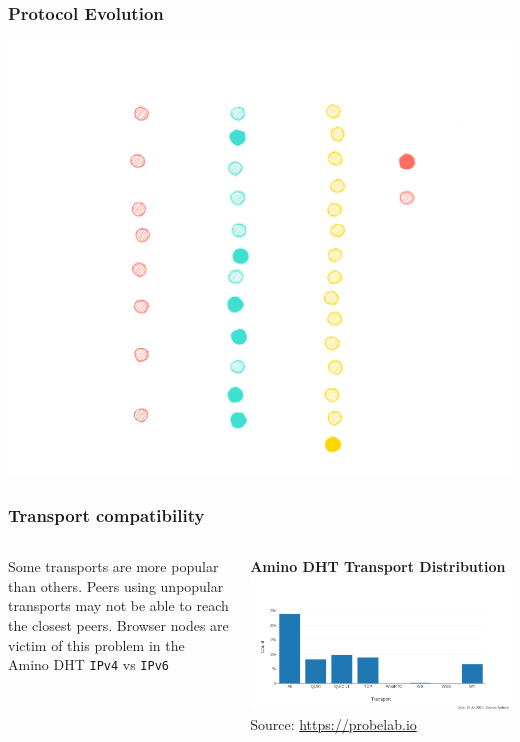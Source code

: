 \documentclass{../shipyard-slide}
\begin{document}
\begin{frame}
\frametitle{Protocol Evolution}

\hspace{2cm}\includegraphics[scale=.13]{resources/rt4-0.png}

\end{frame}

\begin{frame}
\frametitle{Transport compatibility}

\begin{columns}[onlytextwidth]
\begin{column}{0.38\textwidth}
\begin{itemize}
	\itemc Some transports are more popular than others.
	\itemc Peers using unpopular transports may not be able to reach the closest peers.
	\itemc Browser nodes are victim of this problem in the Amino DHT
	\itemc \texttt{IPv4} vs \texttt{IPv6}
\end{itemize}
\end{column}
\begin{column}{0.58\textwidth}
    \begin{center}
    		\textbf{Amino DHT Transport Distribution}
		\includegraphics[width=\textwidth]{resources/dht-transport-distribution.png}
		{\small Source: \url{https://probelab.io}}
    \end{center}
\end{column}
\end{columns}
\end{frame}
\end{document}
